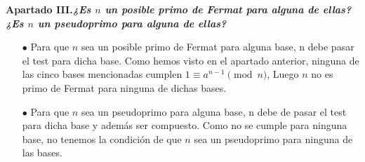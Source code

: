 \documentclass[fleqn]{article}
\begin{document}
    \newpage
    \textbf{Apartado III.\textit{¿Es $n$ un posible primo de Fermat para alguna de ellas? ¿Es $n$ un pseudoprimo para alguna de 
    ellas?}} 


    \begin{enumerate}
        \item[$\bullet$] Para que $n$ sea un posible primo de Fermat para alguna base, n debe pasar el test para dicha base. Como 
                        hemos visto en el apartado anterior, ninguna de las cinco bases mencionadas cumplen $ 1 \equiv a^{n-1} \pmod{n} $,
                        Luego $n$ no es primo de Fermat para ninguna de dichas bases.
        \item[$\bullet$] Para que $n$ sea un pseudoprimo para alguna base, n debe de pasar el test para dicha base y además ser compuesto.
                        Como no se cumple para ninguna base, no tenemos la condición de que $n$ sea un pseudoprimo para ninguna de las bases. 
    \end{enumerate}
\end{document}
